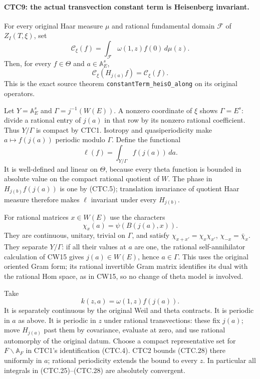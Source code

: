 \paragraph{CTC9: the actual transvection constant term is Heisenberg invariant.}
\label{claim:CTC9}
For every original Haar measure $\mu$ and rational fundamental
domain $\mathcal F$ of $Z_I(T,\xi)$, set
\[
 \mathcal C_\xi(f)=\int_{\mathcal F}\omega(1,z)f(0)\,d\mu(z).
\]
Then, for every $f\in\Theta$ and $a\in\mathbb A_E^s$,
\[
                   \mathcal C_\xi(H_{j(a)}f)=\mathcal C_\xi(f).
 \tag{CTC.25}
\]
This is the exact source theorem
\texttt{constantTerm\_heisO\_along} on its original operators.

Let $Y=\mathbb A_E^s$ and $\Gamma=j^{-1}(W(E))$.  A nonzero
coordinate of $\xi$ shows $\Gamma=E^s$: divide a rational entry of
$j(a)$ in that row by its nonzero rational coefficient.  Thus
$Y/\Gamma$ is compact by CTC1.  Isotropy and quasiperiodicity make
$a\mapsto f(j(a))$ periodic modulo $\Gamma$.  Define the functional
\[
                         \ell(f)=\int_{Y/\Gamma}f(j(a))\,da.
 \tag{CTC.26}
\]
It is well-defined and linear on $\Theta$, because every theta
function is bounded in absolute value on the compact rational
quotient of $W$.  The phase in $H_{j(b)}f(j(a))$ is one by (CTC.5);
translation invariance of quotient Haar measure therefore makes
$\ell$ invariant under every $H_{j(b)}$.

For rational matrices $x\in W(E)$ use the characters
\[
             \chi_x(a)=\psi(B(j(a),x)).
 \tag{CTC.27}
\]
They are continuous, unitary, trivial on $\Gamma$, and satisfy
$\chi_{x+x'}=\chi_x\chi_{x'}$, $\chi_{-x}=\bar\chi_x$.
They separate $Y/\Gamma$: if all their values at $a$ are one,
the rational self-annihilator calculation of CW15 gives
$j(a)\in W(E)$, hence $a\in\Gamma$.
This uses the original oriented Gram form; its rational invertible
Gram matrix identifies its dual with the rational Hom space, as
in CW15, so no change of theta model is involved.

Take
\[
                         k(z,a)=\omega(1,z)f(j(a)).
 \tag{CTC.28}
\]
It is separately continuous by the original Weil and theta
contracts.  It is periodic in $a$ as above.  It is periodic in $z$
under rational transvections: these fix $j(a)$; move $H_{j(a)}$
past them by covariance, evaluate at zero, and use rational
automorphy of the original datum.  Choose a compact representative
set for $F\backslash\mathbb A_F$ in CTC1's identification
(CTC.4).  CTC2 bounds (CTC.28) there uniformly in $a$; rational
periodicity extends the bound to every $z$.  In particular all
integrals in (CTC.25)--(CTC.28) are absolutely convergent.

